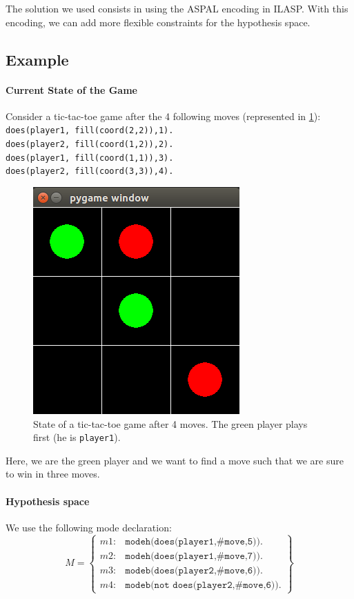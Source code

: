 \documentclass[12pt,twoside]{report}
\begin{document}
\bigskip

The solution we used consists in using the ASPAL encoding in ILASP. With this encoding, we can add more flexible constraints for the hypothesis space.

\subsection{Example}

\paragraph{Current State of the Game}

Consider a tic-tac-toe game after the 4 following moves (represented in \ref{fig:ttt_ex}):\newline
\texttt{does(player1, fill(coord(2,2)),1).\\
does(player2, fill(coord(1,2)),2).\\
does(player1, fill(coord(1,1)),3).\\
does(player2, fill(coord(3,3)),4).}

\begin{figure}[h]
\centering
\includegraphics[width = 0.3\hsize]{ttt_example.png}
\caption{State of a tic-tac-toe game after 4 moves. The green player plays first (he is \texttt{player1}).}
\label{fig:ttt_ex}
\end{figure}

Here, we are the green player and we want to find a move such that we are sure to win in three moves.

\paragraph{Hypothesis space}

We use the following mode declaration:
\[ M=
\begin{Bmatrix} 
m1 :& \texttt{modeh(does(player1,\#move,5)).} \\ 
m2 :& \texttt{modeh(does(player1,\#move,7)).}\\
m3 :& \texttt{modeb(does(player2,\#move,6)).}\\
m4 :& \texttt{modeb(not does(player2,\#move,6)).}
\end{Bmatrix}
\]
\end{document}
